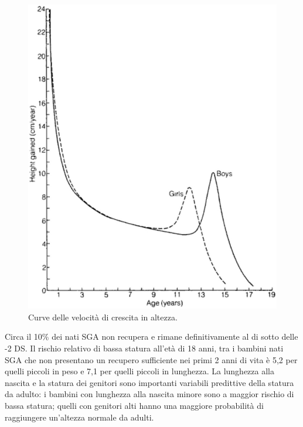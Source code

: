 \begin{figure}[!h]
  \begin{center}
      \includegraphics[scale=0.40]{grafici/curva-velocita} %
  \end{center}
  \caption{Curve delle velocità di crescita in altezza.}
  \label{fig:VelocitaCrescita}
\end{figure}

Circa il 10\% dei nati SGA non recupera e rimane definitivamente al di sotto delle -2 DS.
Il rischio relativo di bassa statura all'età di 18 anni, tra i bambini nati SGA
che non presentano un recupero sufficiente nei primi 2 anni di vita è 5,2 per quelli 
piccoli in peso e 7,1 per quelli piccoli in lunghezza.
La lunghezza alla nascita e la statura dei genitori sono importanti variabili predittive della statura da 
adulto: i bambini con lunghezza alla nascita minore sono a maggior rischio di bassa statura;
quelli con genitori alti hanno una maggiore probabilità di raggiungere
un'altezza normale da adulti.\cite{cianfarani2006hormonal}

